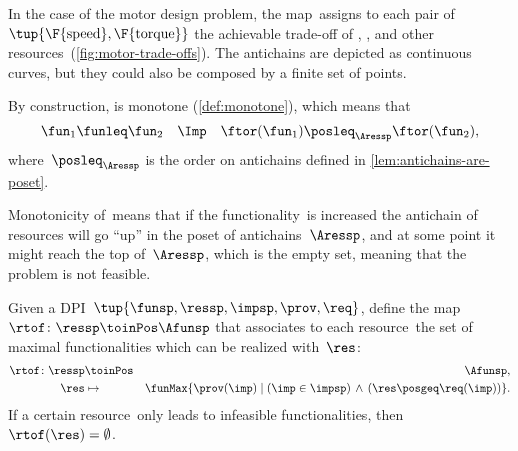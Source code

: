 \begin{example}
  In the case of the motor design problem, the map~\ftor assigns
  to each pair of~$\tup{\F{\text{speed}},\F{\text{torque}}}$
  the achievable trade-off of , , and other resources~(\cref{fig:motor-trade-offs}).
  The antichains are depicted as continuous curves, but they could also
  be composed by a finite set of points.

\end{example}


By construction, \ftor is monotone (\cref{def:monotone}), which means that
\begin{equation*}
  \fun_{1}\funleq\fun_{2}\quad\Imp\quad\ftor(\fun_{1})\posleq_{\Aressp}\ftor(\fun_{2}),
\end{equation*}
where~$\posleq_{\Aressp}$ is the order on antichains defined in \cref{lem:antichains-are-poset}.

Monotonicity of~\ftor means that if the functionality~\fun is increased the antichain of resources will go ``up'' in the poset of antichains~$\Aressp$,
and at some point it might reach the top of~$\Aressp$, which is the empty set, meaning that the problem is not feasible.


\begin{definition}
  \label{def:rtof}
  Given a DPI~$\tup{ \funsp,\ressp,\impsp,\prov,\req}$,
  define the map~$\rtof\colon \ressp\toinPos \Afunsp$ that associates
  to each resource~\res the set of maximal functionalities which can be realized with~$\res$:
  \begin{eqnarray*}
    \rtof\colon \ressp & \toinPos & \Afunsp,\\
    \res& \mapsto & \funMax\{\prov(\imp)\mid\left(\imp\in\impsp\right)\,\wedge\,\left(\res\posgeq\req(\imp)\right)\}.
  \end{eqnarray*}
  If a certain resource~\res only leads to infeasible functionalities, then~$\rtof(\res)=\emptyset$.
\end{definition}

